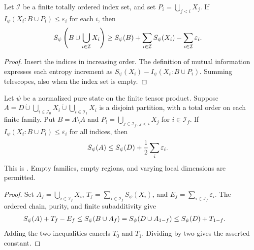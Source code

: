 \begin{theorem}
    \label{thm:finite_product_ordered_chain}
    \leanok
    Let $\mathcal I$ be a finite totally ordered index set, and set
    $P_i=\bigcup_{j<i}X_j$. If
    $I_\psi(X_i:B\cup P_i)\le\varepsilon_i$ for each $i$, then
    \begin{align}
        S_\psi\left(B\cup\bigcup_{i\in\mathcal I}X_i\right)
        \ge S_\psi(B)+\sum_{i\in\mathcal I}S_\psi(X_i)
          -\sum_{i\in\mathcal I}\varepsilon_i.
        \notag
    \end{align}
\end{theorem}
\begin{proof}\leanok
    Insert the indices in increasing order. The definition of mutual
    information expresses each entropy increment as
    $S_\psi(X_i)-I_\psi(X_i:B\cup P_i)$. Summing telescopes, also when
    the index set is empty.
\end{proof}

\begin{theorem}
    \label{thm:finite_product_two_family_cancellation}
    \leanok
    Let $\psi$ be a normalized pure state on the finite tensor product.
    Suppose
    $A=D\mathbin{\dot\cup}\bigcup_{i\in\mathcal I_0}X_i
       \mathbin{\dot\cup}\bigcup_{i\in\mathcal I_1}X_i$
    is a disjoint partition, with a total order on each finite family.
    Put $B=\Lambda\setminus A$ and
    $P_i=\bigcup_{j\in\mathcal I_f,\,j<i}X_j$ for $i\in\mathcal I_f$.
    If $I_\psi(X_i:B\cup P_i)\le\varepsilon_i$ for all indices, then
    \begin{align}
        S_\psi(A)\le S_\psi(D)+\frac12\sum_i\varepsilon_i.
        \notag
    \end{align}
    This is \cite[Lemma~11.1]{OpenAI2026AreaLaw}. Empty families,
    empty regions, and varying local dimensions are permitted.
\end{theorem}
\begin{proof}\leanok
    Set $A_f=\bigcup_{i\in\mathcal I_f}X_i$,
    $T_f=\sum_{i\in\mathcal I_f}S_\psi(X_i)$, and
    $E_f=\sum_{i\in\mathcal I_f}\varepsilon_i$.
    The ordered chain, purity, and finite subadditivity give
    \begin{align}
        S_\psi(A)+T_f-E_f
        &\le S_\psi(B\cup A_f)
         =S_\psi(D\cup A_{1-f})
         \le S_\psi(D)+T_{1-f}.
        \notag
    \end{align}
    Adding the two inequalities cancels $T_0$ and $T_1$.
    Dividing by two gives the asserted constant.
\end{proof}

